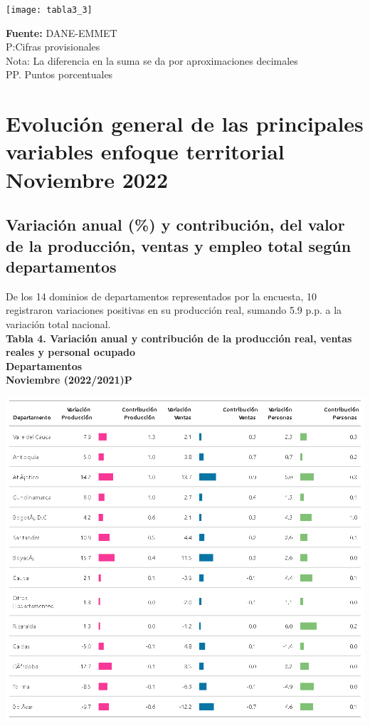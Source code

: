 \documentclass[
]{article}
\begin{document}
\begin{center}\texttt{[image: tabla3\_3]} \end{center}

\textbf{Fuente:} DANE-EMMET\\
P:Cifras provisionales\\
Nota: La diferencia en la suma se da por aproximaciones decimales\\
PP. Puntos porcentuales\\

\hypertarget{evoluciuxf3n-general-de-las-principales-variables-enfoque-territorial-noviembre-2022}{%
\section{Evolución general de las principales variables enfoque
territorial Noviembre
2022}\label{evoluciuxf3n-general-de-las-principales-variables-enfoque-territorial-noviembre-2022}}

\hypertarget{variaciuxf3n-anual-y-contribuciuxf3n-del-valor-de-la-producciuxf3n-ventas-y-empleo-total-seguxfan-departamentos}{%
\subsection{Variación anual (\%) y contribución, del valor de la
producción, ventas y empleo total según
departamentos}\label{variaciuxf3n-anual-y-contribuciuxf3n-del-valor-de-la-producciuxf3n-ventas-y-empleo-total-seguxfan-departamentos}}

De los 14 dominios de departamentos representados por la encuesta, 10
registraron variaciones positivas en su producción real, sumando 5.9
p.p. a la variación total nacional.\\
\newpage
\textbf{Tabla 4. Variación anual y contribución de la producción real, ventas reales y personal ocupado}\\
\textbf{Departamentos}\\
\textbf{Noviembre (2022/2021)P}

\begin{center}\includegraphics[width=12.58in]{tabla4_1} \end{center}
\end{document}
